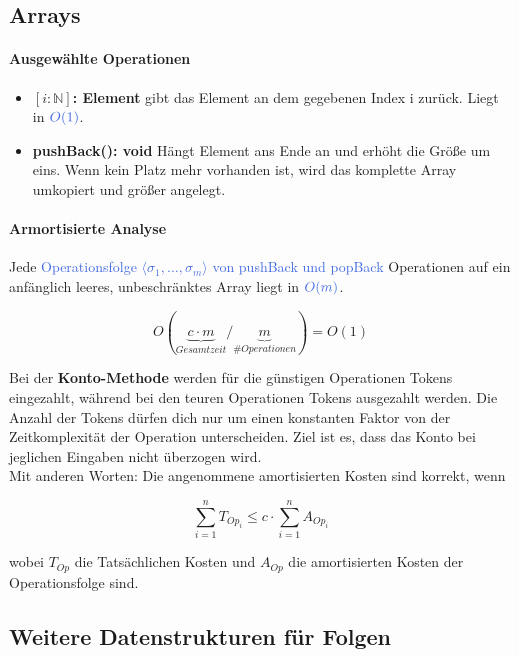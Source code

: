 \documentclass[11pt]{article}
\def \texcol{RoyalBlue}
\begin{document}
\subsection{Arrays}

\paragraph{Ausgewählte Operationen}
\begin{itemize}
\item \textbf{$[i: \mathbb{N}]$: Element} gibt das Element an dem gegebenen Index i zurück. Liegt in $\textcolor{\texcol}{O(1)}$.
\item \textbf{pushBack(): void} Hängt Element ans Ende an und erhöht die Größe um eins. Wenn kein Platz mehr vorhanden ist, wird das komplette Array umkopiert und größer angelegt.
\end{itemize}

\paragraph{Armortisierte Analyse} Jede \textcolor{\texcol}{Operationsfolge $\langle \sigma_{1},\dots,\sigma_{m}\rangle$ von pushBack und popBack} Operationen auf ein anfänglich leeres, unbeschränktes Array liegt in $\textcolor{\texcol}{O(m)}$.

\[O(\underbrace{c\cdot m}_{Gesamtzeit}/\underbrace{m}_{\# Operationen}) = O(1) \]

Bei der \textbf{Konto-Methode} werden für die günstigen Operationen Tokens eingezahlt, während bei den teuren Operationen Tokens ausgezahlt werden. Die Anzahl der Tokens dürfen dich nur um einen konstanten Faktor von der Zeitkomplexität der Operation unterscheiden. Ziel ist es, dass das Konto bei jeglichen Eingaben nicht überzogen wird.
\\
Mit anderen Worten: Die angenommene amortisierten Kosten sind korrekt, wenn 

\[
\sum_{i=1}^n T_{Op_{i}} \leq c \cdot \sum_{i=1}^n A_{Op_{i}}
\]

wobei $T_{Op}$ die Tatsächlichen Kosten und $A_{Op}$ die amortisierten Kosten der Operationsfolge sind.

\subsection{Weitere Datenstrukturen für Folgen}
\end{document}
